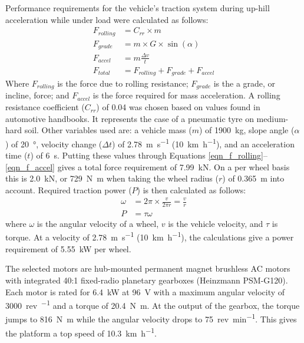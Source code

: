 \documentclass[preprint,authoryear,12pt]{elsarticle}
\begin{document}
        Performance requirements for the vehicle's traction system during up-hill acceleration while under load were calculated as follows:
        \begin{align}
        \label{eqn_f_rolling}
        F_{rolling} &= C_{rr} \times m\\
        F_{grade} &= m \times G \times \sin(\alpha)\\
        F_{accel} &= m \frac{\Delta v}{t}\\
        \label{eqn_f_accel}
        F_{total} &= F_{rolling} + F_{grade} + F_{accel}
        \end{align}
        Where $F_{rolling}$ is the force due to rolling resistance; $F_{grade}$ is the a grade, or incline, force; and $F_{accel}$ is the force required for mass acceleration.
        A rolling resistance coefficient ($C_{rr}$) of 0.04 was chosen based on values found in automotive handbooks.
        It represents the case of a pneumatic tyre on medium-hard soil.
        Other variables used are: a vehicle mass ($m$) of \SI{1900}{\kilo\gram}, slope angle ($\alpha$) of \SI{20}{\degree}, velocity change ($\Delta t$) of \SI{2.78}{\metre\per\second} (\SI{10}{\kilo\meter\per\hour}), and an acceleration time ($t$) of \SI{6}{\second}.
        Putting these values through Equations \ref{eqn_f_rolling}--\ref{eqn_f_accel} gives a total force requirement of \SI{7.99}{\kilo\newton}.
        On a per wheel basis this is \SI{2.0}{\kilo\newton}, or \SI{729}{\newton\meter} when taking the wheel radius ($r$) of \SI{0.365}{\meter} into account.
        Required traction power ($P$) is then calculated as follows:
        \begin{align}
        \label{eqn_f_power}
        \omega &= 2 \pi \times \frac{v}{2 \pi r} = \frac{v}{r}\\
        P &= \tau \omega
        \end{align}
        where $\omega$ is the angular velocity of a wheel, $v$ is the vehicle velocity, and $\tau$ is torque.
        At a velocity of \SI{2.78}{\meter\per\second} (\SI{10}{\kilo\meter\per\hour}), the calculations give a power requirement of \SI{5.55}{\kilo\watt} per wheel.

        The selected motors are hub-mounted permanent magnet brushless AC motors with integrated 40:1 fixed-radio planetary gearboxes (Heinzmann PSM-G120).
        Each motor is rated for \SI{6.4}{\kilo\watt} at \SI{96}{\volt} with a maximum angular velocity of \SI{3000}{rev\per\min} and a torque of \SI{20.4}{\newton\meter}.
        At the output of the gearbox, the torque jumps to \SI{816}{\newton\meter} while the angular velocity drops to \SI{75}{rev\per\minute}.
        This gives the platform a top speed of \SI{10.3}{\kilo\meter\per\hour}.
\end{document}
